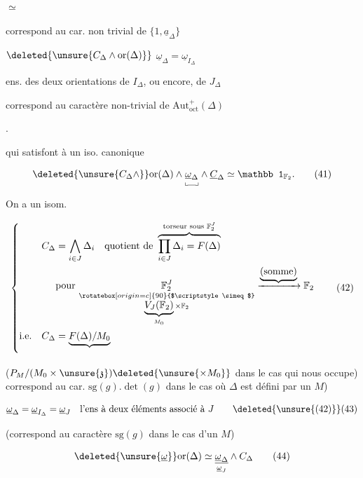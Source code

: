 \begin{minipage}{.22\linewidth}
$\simeq$

correspond au car. non trivial de $\{1,\underline a_\Delta\}$

\end{minipage}\quad\begin{minipage}{.22\linewidth}\raggedright\footnotesize
$\deleted{\unsure{C_\Delta\wedge\mathrm{or}(\Delta)}}$
$\underline\omega_\Delta=\underline\omega_{I_\Delta}$

ens. des deux orientations de $I_\Delta$, ou encore, de $J_\Delta$

correspond au caractère non-trivial de $\mathrm{Aut}_{\mathrm{oct}}^+(\Delta)$
\end{minipage}\right.\)

qui satisfont à un iso. canonique

\[
\deleted{\unsure{C_\Delta\wedge}}\mathrm{or}(\Delta)\wedge\underset{\llcorner\mkern-2mu\rule{.85em}{.35pt}\mkern-2mu\lrcorner}{\underline\omega_\Delta}\wedge\underline C_\Delta
\simeq\mathbb 1_{\mathbb F_2}. \tag*{(41)}
\]

On a un isom.

\[
\left\{\begin{aligned}
 C_\Delta&=\bigwedge_{i\in J}\Delta_i\quad\text{quotient de }
 \overbrace{\prod_{i\in J}\Delta_i=F(\Delta)}^{\text{torseur sous }\mathbb F_2^J}\\
 &\text{pour }\underset{\substack{\rotatebox[origin=c]{90}{$\scriptstyle\simeq$}\\\underbrace{V_J(\mathbb F_2)}_{M_0}\times\mathbb F_2}}{\mathbb F_2^J}
 \xrightarrow{\underbrace{(\text{somme})}}\mathbb F_2\\
 \text{i.e.}\quad C_\Delta&=\underbrace{F(\Delta)/M_0}_{} 
\end{aligned}\right. \tag*{(42)}
\]

($P_M/(M_0\times\unsure{\mathfrak z})\deleted{\unsure{\times M_0}}$ dans le cas qui nous occupe) correspond au car. $\mathrm{sg}(g).\det(g)$ dans le cas  où $\Delta$ est défini par un $M$)

\reversemarginpar{}\normalmarginpar

\[
 \underline\omega_\Delta=\underline\omega_{I_\Delta}=\underline\omega_J
 \quad\text{l'ens à deux éléments associé à }J
 \tag*{\deleted{\unsure{(42)}}(43)}
\]

(correspond au caractère $\mathrm{sg}(g)$ dans le cas d'un $M$)

\[
 \deleted{\unsure{\underline\omega}}\mathrm{or}(\Delta)\simeq
 \underset{\underline\omega_J}{\underline{\underline\omega_\Delta}}\wedge C_\Delta \tag*{(44)}
\]

